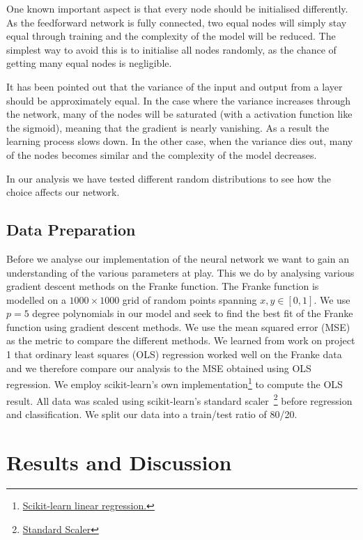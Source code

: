 \documentclass[a4paper,
amsfonts,
amssymb,
amsmath,
reprint,
showkeys,
nofootinbib,
twoside]{revtex4-2}
\begin{document}
One known important aspect is that every node should be initialised differently. As the feedforward network is fully connected, two equal nodes will simply stay equal through training and the complexity of the model will be reduced. The simplest way to avoid this is to initialise all nodes randomly, as the chance of getting many equal nodes is negligible.

It has been pointed out that the variance of the input and output from a layer should be approximately equal\cite{gb10}. In the case where the variance increases through the network, many of the nodes will be saturated (with a activation function like the sigmoid), meaning that the gradient is nearly vanishing. As a result the learning process slows down. In the other case, when the variance dies out, many of the nodes becomes similar and the complexity of the model decreases.

In our analysis we have tested different random distributions to see how the choice affects our network.

\subsection{Data Preparation}

Before we analyse our implementation of the neural network we want to gain an understanding of the various parameters at play. This we do by analysing various gradient descent methods on the Franke function. The Franke function is modelled on a $1000 \times 1000$ grid of random points spanning $x, y \in [0, 1]$.  We use $p = 5$ degree polynomials in our model and seek to find the best fit of the Franke function using gradient descent methods. We use the mean squared error (MSE) as the metric to compare the different methods. We learned from work on project 1 that ordinary least squares (OLS) regression worked well on the Franke data and we therefore compare our analysis to the MSE obtained using OLS regression. We employ scikit-learn's own implementation\footnote{\href{https://scikit-learn.org/stable/modules/generated/sklearn.linear_model.LinearRegression.html}{Scikit-learn linear regression.}} to compute the OLS result. All data was scaled using scikit-learn's standard scaler~\footnote{\href{https://scikit-learn.org/stable/modules/generated/sklearn.preprocessing.StandardScaler.html}{Standard Scaler}} before regression and classification. We split our data into a train/test ratio of 80/20.

\section{Results and Discussion}
\label{results}
\end{document}
